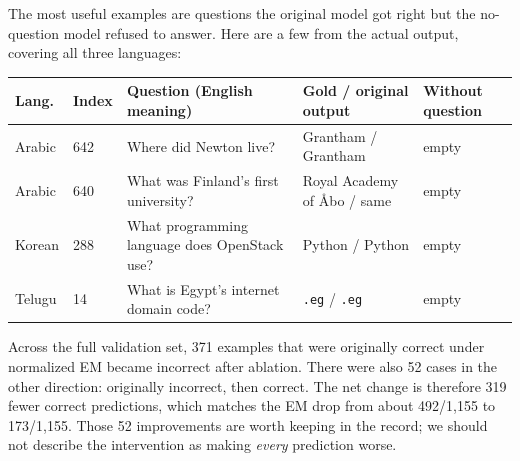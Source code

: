 \documentclass[10pt,a4paper]{article}
\newcommand{\sectionline}[1]{\vspace{2pt}{\large\bfseries #1}\par\vspace{0pt}}
\begin{document}
\sectionline{4. Some concrete examples}
The most useful examples are questions the original model got right but the no-question model refused to answer. Here are a few from the actual output, covering all three languages:

\begin{center}
\small
\begin{tabularx}{\linewidth}{@{}p{1.1cm}p{1.1cm}Yp{2.4cm}p{2.0cm}@{}}
\toprule
Lang. & Index & Question (English meaning) & Gold / original output & Without question \\
\midrule
Arabic & 642 & Where did Newton live? & Grantham / Grantham & empty \\
Arabic & 640 & What was Finland's first university? & Royal Academy of \AA bo / same & empty \\
Korean & 288 & What programming language does OpenStack use? & Python / Python & empty \\
Telugu & 14 & What is Egypt's internet domain code? & \texttt{.eg} / \texttt{.eg} & empty \\
\bottomrule
\end{tabularx}
\end{center}
Across the full validation set, 371 examples that were originally correct under normalized EM became incorrect after ablation. There were also 52 cases in the other direction: originally incorrect, then correct. The net change is therefore 319 fewer correct predictions, which matches the EM drop from about 492/1,155 to 173/1,155. Those 52 improvements are worth keeping in the record; we should not describe the intervention as making \emph{every} prediction worse.
\end{document}
